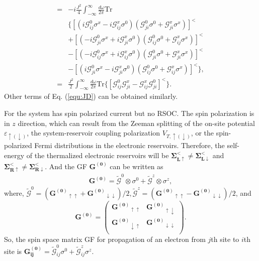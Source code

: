\documentclass[aps,prb,twocolumn,showpacs,amssymb]{revtex4-1}
\begin{document}
\begin{appendix}
\begin{equation}
\begin{aligned}
=&-i\frac{J^2}{4}\int^{\infty}_{-\infty}\frac{d\omega}{2\pi}\mathrm{Tr}\\
&\{[(i\mathcal{G}^{0}_{ij}\sigma^{x}-i\mathcal{G}^{x}_{ij}\sigma^{0})
(\mathcal{G}^{0}_{ji}\sigma^{0}+\mathcal{G}^{x}_{ji}\sigma^{x})]^{<}\\
&+[(-i\mathcal{G}^{0}_{ji}\sigma^{x}+i\mathcal{G}^{x}_{ji}\sigma^{0})
(\mathcal{G}^{0}_{ij}\sigma^{0}+\mathcal{G}^{x}_{ij}\sigma^{x})]^{<}\\
&-[(-i\mathcal{G}^{0}_{ij}\sigma^{x}+i\mathcal{G}^{x}_{ij}\sigma^{0})
(\mathcal{G}^{0}_{ji}\sigma^{0}+\mathcal{G}^{x}_{ji}\sigma^{x})]^{<}\\
&-[(i\mathcal{G}^{0}_{ji}\sigma^{x}-i\mathcal{G}^{x}_{ji}\sigma^{0})
(\mathcal{G}^{0}_{ij}\sigma^{0}+\mathcal{G}^{x}_{ij}\sigma^{x})]^{<}\},\\
=&\frac{J^2}{2}\int^{\infty}_{-\infty}\frac{d\omega}{2\pi}\mathrm{Tr}\{[\mathcal{G}^{0}_{ij}\mathcal{G}^{x}_{ji}-\mathcal{G}^{x}_{ij}\mathcal{G}^{0}_{ji}]^{<}\}.
\end{aligned}
\end{equation}
Other terms of Eq. (\ref{equ:JD}) can be obtained similarly.

For the system has spin polarized current but no RSOC. The spin polarization is in $z$ direction, which can result from the Zeeman splitting of the on-site  potential $\varepsilon_{\uparrow(\downarrow)}$, the system-reservoir coupling polarization $V_{T,\uparrow(\downarrow)}$, or the spin-polarized Fermi distributions in the electronic reservoirs. Therefore, the self-energy of the thermalized electronic reservoirs will be $\bm{\Sigma^<_{L\uparrow}}\neq\bm{\Sigma^<_{L\downarrow}}$ and $\bm{\Sigma^<_{R\uparrow}}\neq\bm{\Sigma^<_{R\downarrow}}$. And the GF $\bm{G^{(0)}}$ can be written as
\begin{equation}\label{aequ:G0z}
\begin{aligned}
\bm{G^{(0)}}=\bm{\tilde{\mathcal{G}}}^{0}\otimes\sigma^{0}+\bm{\tilde{\mathcal{G}}}^{z}\otimes\sigma^{z},
\end{aligned}
\end{equation}
where, $\bm{\tilde{\mathcal{G}}}^{0}=(\bm{G^{(0)}}_{\uparrow\uparrow}+\bm{G^{(0)}}_{\downarrow\downarrow})/2 ,\bm{\tilde{\mathcal{G}}}^{z}=(\bm{G^{(0)}}_{\uparrow\uparrow}-\bm{G^{(0)}}_{\downarrow\downarrow})/2$, and
\begin{equation*}
\bm{G^{(0)}}=\left(\begin{array}{cc}
\bm{G^{(0)}}_{\uparrow\uparrow} & \bm{G^{(0)}}_{\uparrow\downarrow} \\
\bm{G^{(0)}}_{\downarrow\uparrow} & \bm{G^{(0)}}_{\downarrow\downarrow} \\
\end{array}\right).
\end{equation*}
So, the spin space matrix GF for propagation of an electron from $j$th site to $i$th site is $\bm{G^{(0)}_{ij}}=\tilde{\mathcal{G}}^{0}_{ij}\sigma^{0}+\tilde{\mathcal{G}}^{z}_{ij}\sigma^{z}$.

\end{appendix}
\end{document}
